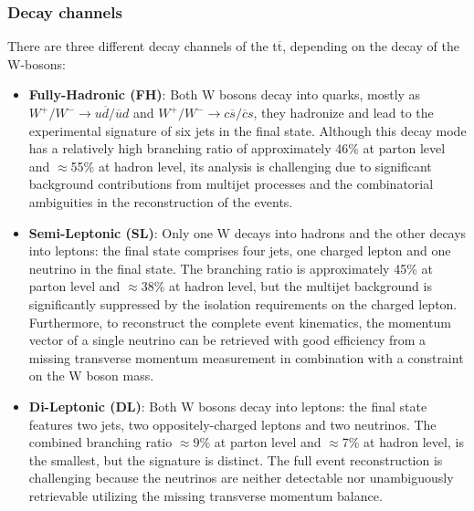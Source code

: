 \subsubsection{Decay channels}
\noindent There are three different decay channels of the t$\overline{\text{t}}$, depending on the decay of the W-bosons:
\begin{itemize}
    \item \textbf{Fully-Hadronic (FH)}: Both W bosons decay into quarks, mostly as $W^+/W^- \rightarrow u\overline{d}/\overline{u}d$ and $W^+/W^- \rightarrow c\overline{s}/\overline{c}s$, they hadronize and lead to the experimental signature of six jets in the final state. Although this decay mode has a relatively high branching ratio of approximately 46\% at parton level and $\approx$55\% at hadron level, its analysis is challenging due to significant background contributions from multijet processes and the combinatorial ambiguities in the reconstruction of the events. 
    \item \textbf{Semi-Leptonic (SL)}: Only one W decays into hadrons and the other decays into leptons: the final state comprises four jets, one charged lepton and one neutrino in the final state. The branching ratio is approximately 45\% at parton level and $\approx$38\% at hadron level, but the multijet background is significantly suppressed by the isolation requirements on the charged lepton. Furthermore, to reconstruct the complete event kinematics, the momentum vector of a single neutrino can be retrieved with good efficiency from a missing transverse momentum measurement in combination with a constraint on the W boson mass.
    \item \textbf{Di-Leptonic (DL)}: Both W bosons decay into leptons: the final state features two jets, two oppositely-charged leptons and two neutrinos. The combined branching ratio $\approx$9\% at parton level and $\approx$7\% at hadron level, is the smallest, but the signature is distinct. The full event reconstruction is challenging because the neutrinos are neither detectable nor unambiguously retrievable utilizing the missing transverse momentum balance. 
\end{itemize}


